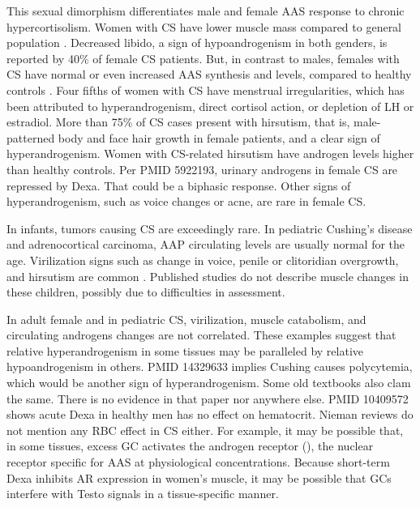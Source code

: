 \documentclass[12pt,english]{report}\usepackage[]{graphicx}\usepackage[]{color}
\newenvironment{lyxgreyedout}
  {\textcolor{note_fontcolor}\bgroup\ignorespaces}
  {\ignorespacesafterend\egroup}
\begin{document}
This sexual dimorphism differentiates male and female AAS response
to chronic hypercortisolism. Women with CS have lower muscle mass
compared to general population \citep{wajchenberg1995estimation}.
Decreased libido, a sign of hypoandrogenism in both genders, is reported
by 40\% of female CS patients\citep{valassi2011european}. But, in
contrast to males, females with CS have normal or even increased AAS
synthesis and levels, compared to healthy controls \citep{vierhapper2000production,luisi1978plasma}.
Four fifths of women with CS have menstrual irregularities, which
has been attributed to hyperandrogenism, direct cortisol action, or
depletion of LH or estradiol\citep{lado-abeal1998menstrual}. More
than 75\% of CS cases present with hirsutism, that is, male-patterned
body and face hair growth in female patients, and a clear sign of
hyperandrogenism\citep{newell-price2006cushings,valassi2011european}.
Women with CS-related hirsutism have androgen levels higher than healthy
controls\citep{smals1977plasma}.%
\begin{lyxgreyedout}
Per PMID 5922193, urinary androgens in female CS are repressed by
Dexa. That could be a biphasic response.%
\end{lyxgreyedout}
{} Other signs of hyperandrogenism, such as voice changes or acne, are
rare in female CS.

In infants, tumors causing CS are exceedingly rare. In pediatric Cushing's
disease and adrenocortical carcinoma, AAP circulating levels are usually
normal for the age\citep{hauffa1984dissociation,wajchenberg2000adrenocortical}.
Virilization signs such as change in voice, penile or clitoridian
overgrowth, and hirsutism are common \citep{tyler1972laboratory}.
Published studies do not describe muscle changes in these children,
possibly due to difficulties in assessment.

In adult female and in pediatric CS, virilization, muscle catabolism,
and circulating androgens changes are not correlated. These examples
suggest that relative hyperandrogenism in some tissues may be paralleled
by relative hypoandrogenism in others.%
\begin{lyxgreyedout}
PMID 14329633 implies Cushing causes polycytemia, which would be another
sign of hyperandrogenism. Some old textbooks also clam the same. There
is no evidence in that paper nor anywhere else. PMID 10409572 shows
acute Dexa in healthy men has no effect on hematocrit. Nieman reviews
do not mention any RBC effect in CS either.%
\end{lyxgreyedout}
For example, it may be possible that, in some tissues, excess GC activates
the androgen receptor ()\citep{arora2013glucocorticoid},
the nuclear receptor specific for AAS at physiological concentrations.
Because short-term Dexa inhibits AR expression in women's muscle\citep{inder2010dexamethasone},
it may be possible that GCs interfere with Testo signals in a tissue-specific
manner.
\end{document}
